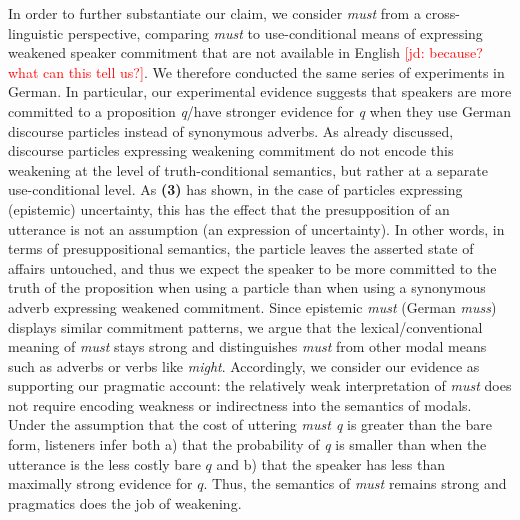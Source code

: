 \documentclass[11pt]{article}
\newcommand{\jd}[1]{\textcolor{Red}{[jd: #1]}}
\begin{document}
In order to further substantiate our claim, we consider \emph{must} from a cross-linguistic perspective, comparing \emph{must} to use-conditional means of expressing weakened speaker commitment that are not available in English \jd{because? what can this tell us?}. We therefore conducted the same series of experiments in German. In particular, our experimental evidence suggests that speakers are more committed to a proposition \emph{q}/have stronger evidence for \emph{q} when they use German discourse particles instead of synonymous adverbs. As already discussed, discourse particles expressing weakening commitment do not encode this weakening at the level of truth-conditional semantics, but rather at a separate use-conditional level. As \textbf{(3) }has shown, in the case of particles expressing (epistemic) uncertainty, this has the effect that the presupposition of an utterance is not an assumption (an expression of uncertainty). In other words, in terms of presuppositional semantics, the particle leaves the asserted state of affairs untouched, and thus we expect the speaker to be more committed to the truth of the proposition when using a particle than when using a synonymous adverb expressing weakened commitment. Since epistemic \emph{must} (German \emph{muss}) displays similar commitment patterns, we argue that the lexical/conventional meaning of \emph{must} stays strong and distinguishes \emph{must} from other modal means such as adverbs or verbs like \emph{might}. Accordingly, we consider our evidence as supporting our pragmatic account: the relatively weak interpretation of \emph{must} does not require encoding weakness or indirectness into the semantics of modals. Under the assumption that the cost of uttering \emph{must q} is greater than the bare form, listeners infer both a) that the probability of \emph{q} is smaller than when the utterance is the less costly bare $q$ and b) that the speaker has less than maximally strong evidence for $q$. Thus, the semantics of \emph{must} remains strong and pragmatics does the job of weakening. %

\end{document}
